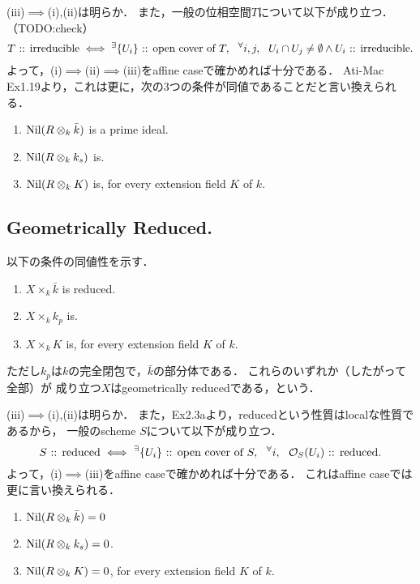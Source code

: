 \documentclass[a4paper]{jsarticle}
\newcommand{\shO}{\mathcal{O}}
\begin{document}
    (iii)$\implies$(i),(ii)は明らか．
    また，一般の位相空間$T$について以下が成り立つ．
    （TODO:check）
    \[
        T\text{ :: irreducible}
        \iff
        {}^{\exists} \{U_i\}\text{ :: open cover of }T,~~
        {}^{\forall} i,j,~~ U_i \cap U_j \neq \emptyset \land U_i\text{ :: irreducible.}
    \]
    よって，(i)$\implies$(ii)$\implies$(iii)をaffine caseで確かめれば十分である．
    Ati-Mac Ex1.19より，これは更に，次の3つの条件が同値であることだと言い換えられる．
    \begin{enumerate}[label=(\roman*)]
        \item $\operatorname{Nil}(R \otimes_k \bar{k})$ is a prime ideal.
        \item $\operatorname{Nil}(R \otimes_k k_s)$ is.
        \item $\operatorname{Nil}(R \otimes_k K)$ is, for every extension field $K$ of $k$.
    \end{enumerate}

    \subsection{Geometrically Reduced.}
    以下の条件の同値性を示す．
    \begin{enumerate}[label=(\roman*)]
        \item $X \times_k \bar{k}$ is reduced.
        \item $X \times_k k_p$ is.
        \item $X \times_k K$ is, for every extension field $K$ of $k$.
    \end{enumerate}
    ただし$k_p$は$k$の完全閉包で，$\bar{k}$の部分体である．
    これらのいずれか（したがって全部）が
    成り立つ$X$はgeometrically reducedである，という．

    (iii)$\implies$(i),(ii)は明らか．
    また，Ex2.3aより，reducedという性質はlocalな性質であるから，
    一般のscheme $S$について以下が成り立つ．
    \[
        S\text{ :: reduced}
        \iff
        \Exists{\{U_i\}\text{ :: open cover of }S}
        \Forall{i} \shO_S(U_i)\text{ :: reduced.}
    \]
    よって，(i)$\implies$(iii)をaffine caseで確かめれば十分である．
    これはaffine caseでは更に言い換えられる．
    \begin{enumerate}[label=(\roman*)]
        \item $\operatorname{Nil}(R \otimes_k \bar{k})=0$
        \item $\operatorname{Nil}(R \otimes_k k_s)=0$.
        \item $\operatorname{Nil}(R \otimes_k K)=0$, for every extension field $K$ of $k$.
    \end{enumerate}
\end{document}
